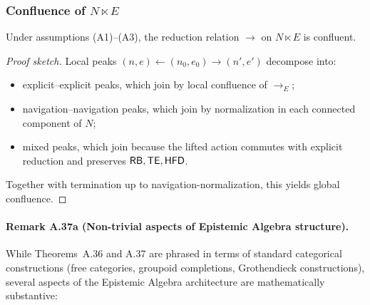 \subsubsection{Confluence of \texorpdfstring{\(N \ltimes E\)}{N ⋉ E}}

\begin{theorem}
\label{thm:n-e-confluence}
Under assumptions \textup{(A1)}--\textup{(A3)}, the reduction relation
\(\to\) on \(N \ltimes E\) is confluent.
\end{theorem}

\begin{proof}[Proof sketch]
Local peaks \((n, e) \leftarrow (n_0, e_0) \to (n', e')\) decompose into:
\begin{itemize}
  \item explicit--explicit peaks, which join by local confluence of
        \(\to_E\);
  \item navigation--navigation peaks, which join by normalization in each
        connected component of \(N\);
  \item mixed peaks, which join because the lifted action commutes with
        explicit reduction and preserves \(\mathsf{RB},\mathsf{TE},\mathsf{HFD}\).
\end{itemize}
Together with termination up to navigation-normalization, this yields
global confluence.
\end{proof}
\paragraph{Remark A.37a (Non-trivial aspects of Epistemic Algebra structure).}
While Theorems~A.36 and A.37 are phrased in terms of standard categorical constructions
(free categories, groupoid completions, Grothendieck constructions), several aspects of the
Epistemic Algebra architecture are mathematically substantive:

